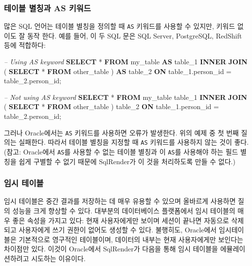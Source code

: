 \documentclass[11pt]{book}
\newenvironment{Shaded}{\begin{snugshade}}{\end{snugshade}}
\newcommand{\KeywordTok}[1]{\textcolor[rgb]{0.13,0.29,0.53}{\textbf{#1}}}
\newcommand{\DecValTok}[1]{\textcolor[rgb]{0.00,0.00,0.81}{#1}}
\newcommand{\CommentTok}[1]{\textcolor[rgb]{0.56,0.35,0.01}{\textit{#1}}}
\newcommand{\NormalTok}[1]{#1}
\theoremstyle{definition}
\theoremstyle{definition}
\theoremstyle{definition}
\theoremstyle{remark}
\begin{document}
\subsubsection*{테이블 별칭과 AS 키워드}\label{--as-}

많은 SQL 언어는 테이블 별칭을 정의할 때 \texttt{AS} 키워드를 사용할 수
있지만, 키워드 없이도 잘 동작 한다. 예를 들어, 이 두 SQL 문은 SQL
Server, PostgreSQL, RedShift 등에 적합하다:

\begin{Shaded}
\begin{Highlighting}[]
\CommentTok{-- Using AS keyword}
\KeywordTok{SELECT}\NormalTok{ * }
\KeywordTok{FROM}\NormalTok{ my_table }\KeywordTok{AS}\NormalTok{ table_}\DecValTok{1}
\KeywordTok{INNER} \KeywordTok{JOIN}\NormalTok{ (}
  \KeywordTok{SELECT}\NormalTok{ * }\KeywordTok{FROM}\NormalTok{ other_table}
\NormalTok{) }\KeywordTok{AS}\NormalTok{ table_}\DecValTok{2}
\KeywordTok{ON}\NormalTok{ table_1.person_id = table_2.person_id;}

\CommentTok{-- Not using AS keyword}
\KeywordTok{SELECT}\NormalTok{ * }
\KeywordTok{FROM}\NormalTok{ my_table table_}\DecValTok{1}
\KeywordTok{INNER} \KeywordTok{JOIN}\NormalTok{ (}
  \KeywordTok{SELECT}\NormalTok{ * }\KeywordTok{FROM}\NormalTok{ other_table}
\NormalTok{) table_}\DecValTok{2}
\KeywordTok{ON}\NormalTok{ table_1.person_id = table_2.person_id;}
\end{Highlighting}
\end{Shaded}

그러나 Oracle에서는 \texttt{AS} 키워드를 사용하면 오류가 발생한다. 위의
예제 중 첫 번째 질의는 실패한다. 따라서 테이블 별칭을 지정할 때
\texttt{AS} 키워드를 사용하지 않는 것이 좋다. (참고: Oracle에서
\texttt{AS}를 사용할 수 없는 테이블 별칭과 이 \texttt{AS}를 사용해야
하는 필드 별칭을 쉽게 구별할 수 없기 때문에 SqlRender가 이 것을
처리하도록 만들 수 없다.)

\subsubsection*{임시 테이블}\label{-}

임시 테이블은 중간 결과를 저장하는 데 매우 유용할 수 있으며 올바르게
사용하면 질의 성능을 크게 향상할 수 있다. 대부분의 데이터베이스
플랫폼에서 임시 테이블의 매우 좋은 속성을 가지고 있다: 현재 사용자에게만
보이며 세션이 끝나면 자동으로 삭제되고 사용자에게 쓰기 권한이 없어도
생성할 수 있다. 불행히도, Oracle에서 임시테이블은 기본적으로 영구적인
테이블이며, 데이터의 내부는 현재 사용자에게만 보인다는 차이점만 있다.
이것이 Oracle에서 SqlRender가 다음을 통해 임시 테이블을 에뮬레이션하려고
시도하는 이유이다.
\end{document}
